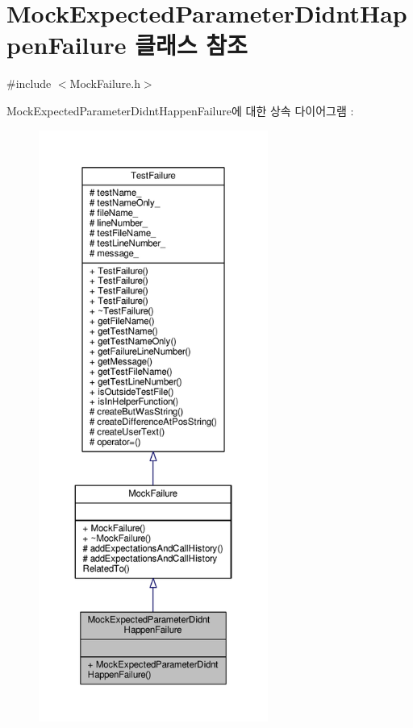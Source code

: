 \hypertarget{class_mock_expected_parameter_didnt_happen_failure}{}\section{Mock\+Expected\+Parameter\+Didnt\+Happen\+Failure 클래스 참조}
\label{class_mock_expected_parameter_didnt_happen_failure}


{\ttfamily \#include $<$Mock\+Failure.\+h$>$}



Mock\+Expected\+Parameter\+Didnt\+Happen\+Failure에 대한 상속 다이어그램 \+: 
\nopagebreak
\begin{figure}[H]
\begin{center}
\leavevmode
\includegraphics[height=550pt]{class_mock_expected_parameter_didnt_happen_failure__inherit__graph}
\end{center}
\end{figure}


